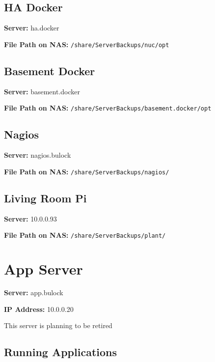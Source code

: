 \documentclass[]{article}
\begin{document}
\subsection{\texorpdfstring{{HA Docker}}{HA Docker}}

\textbf{Server: }
{ha.docker}

\textbf{File Path on NAS: }
\texttt{/share/ServerBackups/nuc/opt}

\subsection{\texorpdfstring{{Basement Docker}}{Basement Docker}}

\textbf{Server: }
{basement.docker}

\textbf{File Path on NAS: }
\texttt{/share/ServerBackups/basement.docker/opt}

\subsection{\texorpdfstring{{Nagios}}{Nagios}}

\textbf{Server: }
{nagios.bulock}

\textbf{File Path on NAS: }
\texttt{/share/ServerBackups/nagios/}

\subsection{\texorpdfstring{{Living Room Pi}}{Living Room Pi}}

\textbf{Server: }
{10.0.0.93}

\textbf{File Path on NAS: }
\texttt{/share/ServerBackups/plant/}


\newpage

\vspace{\baselineskip}\section*{App Server}

\textbf{Server: }
{app.bulock}

\textbf{IP Address: }
{10.0.0.20}

{This server is planning to be retired}

\subsection{\texorpdfstring{{Running Applications}}{Running Applications}}
\end{document}
